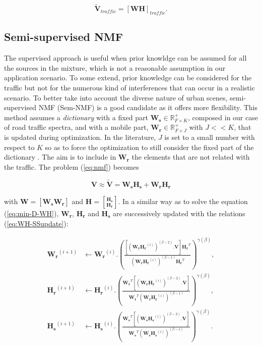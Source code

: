 \documentclass[twocolumn,a4paper,10pt]{article}
\begin{document}
\begin{equation}\label{eq:separationExtraction}
\mathbf{\tilde{V}}_{traffic} = \left[ \mathbf{WH} \right]_{traffic}.
\end{equation}

\subsection{Semi-supervised NMF}

The supervised approach is useful when prior knowldge can be assumed for all the sources in the mixture, which is not a reasonable assumption in our application scenario. To some extend, prior knowledge can be considered for the traffic but not for the numerous kind of interferences that can occur in a realistic scenario. To better take into account the diverse nature of urban scenes, semi-supervised NMF (Sem-NMF)\cite{lee_semi-supervised_2010} is a good candidate as it offers more flexibility. This method assumes a \textit{dictionary} with a fixed part $\mathbf{W_s} \in \mathbb{R}^+_{F\times K}$, composed in our case of road traffic spectra, and with a mobile part, $\mathbf{W_r} \in \mathbb{R}^+_{F\times J}$ with $J <<K$, that is updated during optimization. In the literature, $J$ is set to a small number with respect to $K$ so as to force the optimization to still consider the fixed part of the dictionary \cite{lefevre2012semi}. The aim is to include in $\mathbf{W_r}$ the elements that are not related with the traffic. The problem (\ref{eq:nmf}) becomes

\begin{equation}
\mathbf{V} \approx \mathbf{\tilde{V}} = \mathbf{W_s H_s}+ \mathbf{W_r H_r}
\end{equation}

 with $\mathbf{W} = \left[\mathbf{W_s} \mathbf{W_r} \right]$ and $\mathbf{H} = \genfrac[]{0pt}{0}{\mathbf{H_s}}{\mathbf{H_r}}$. In a similar way as to solve the equation (\ref{eq:min-D-WH}), $\mathbf{W_r}$, $\mathbf{H_r}$ and $\mathbf{H_s}$ are successively updated with the relations (\ref{eq:WH-SSupdate}):

{\scriptsize
\begin{subequations}\label{eq:WH-SSupdate}
\begin{align}
\mathbf{W_r}^{(i+1)} &\leftarrow \mathbf{W_r}^{(i)}.\left(\frac{\left[\left(\mathbf{W_r H_r}^{(i)} \right)^{(\beta-2)}.\mathbf{V} \right]\mathbf{H_r}^T}{\left(\mathbf{W_r H_r}^{(i)} \right)^{(\beta-1)}\mathbf{H_r}^T}\right)^{\gamma(\beta)}, \label{eq:W_r_SS}\\
\mathbf{H_r}^{(i+1)} &\leftarrow \mathbf{H_r}^{(i)}.\left(\frac{\mathbf{W_r}^T \left[\left(\mathbf{W_r H_r}^{(i)} \right)^{(\beta-2)}.\mathbf{V} \right]}{\mathbf{W_r}^T \left(\mathbf{W_r H_r}^{(i)} \right)^{(\beta-1)}}\right)^{\gamma(\beta)}, \label{eq:H_r_SS}\\
\mathbf{H_s}^{(i+1)} &\leftarrow \mathbf{H_s}^{(i)}.\left(\frac{\mathbf{W_s}^T \left[\left(\mathbf{W_s H_s}^{(i)} \right)^{(\beta-2)}.\mathbf{V} \right]}{\mathbf{W_s}^T \left(\mathbf{W_s H_s}^{(i)} \right)^{(\beta-1)}}\right)^{\gamma(\beta)}.\label{eq:H_s_SS}
\end{align}
\end{subequations}}
\end{document}
